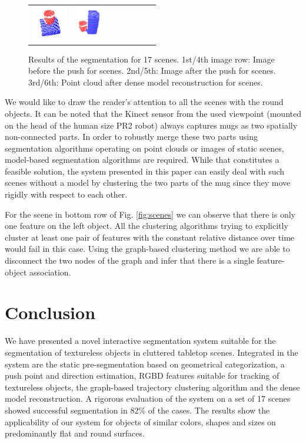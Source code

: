 \begin{figure}[h!]
\begin{tabular}{cccccccc}
    \includegraphics[height=1.5cm]{pictures/163.png}&
    \includegraphics[height=1.5cm]{pictures/173.png}\\
    \end{tabular}
    	\caption{Results  of the  segmentation for  17  scenes.  1st/4th
          image row:  Image before  the push  for scenes.   2nd/5th:
          Image after the push for scenes.  3rd/6th: Point cloud
          after dense model reconstruction for scenes.}
    \label{fig:evaluation1}
\end{figure}

We would  like to draw the  reader's attention to all  the scenes with
the round objects. 
It can be noted that
the Kinect sensor from the used viewpoint (mounted on the head of the human size PR2 robot) always
captures mugs as two spatially non-connected parts.
In order to robustly merge these two parts using segmentation
algorithms operating on point clouds or images of static scenes, 
model-based segmentation algorithms are required. While that constitutes a feasible solution,
the system presented in this
paper can easily deal with such scenes without a model by clustering the two
parts of the mug since they move rigidly with respect to each other.

 For  the scene in  bottom row  of Fig. \ref{fig:scenes}  we can  observe that
 there is only one feature on the left object.  All   the  clustering  algorithms  trying  to
 explicitly cluster  at least one  pair of features with  the constant
 relative  distance over  time would  fail  in this  case.  Using  the
 graph-based clustering method we are able to disconnect the two nodes
 of  the  graph  and infer  that  there  is a single feature-object association.



\section{Conclusion}
\label{sec:conclusion}
We have  presented a novel interactive segmentation  system suitable for
the segmentation of textureless  objects in cluttered tabletop scenes.
Integrated  in the  system are  the static  pre-segmentation  based on
geometrical   categorization,  a  push   point and direction estimation, 
RGBD features  suitable for tracking of
textureless objects,  the graph-based trajectory  clustering algorithm
and the  dense model reconstruction.  A rigorous  evaluation of the
system on a  set of 17 scenes showed successful segmentation in $82\%$ of the cases.  
The results show the applicability of our system
for objects of similar colors,  shapes and sizes on predominantly flat
and  round surfaces.  